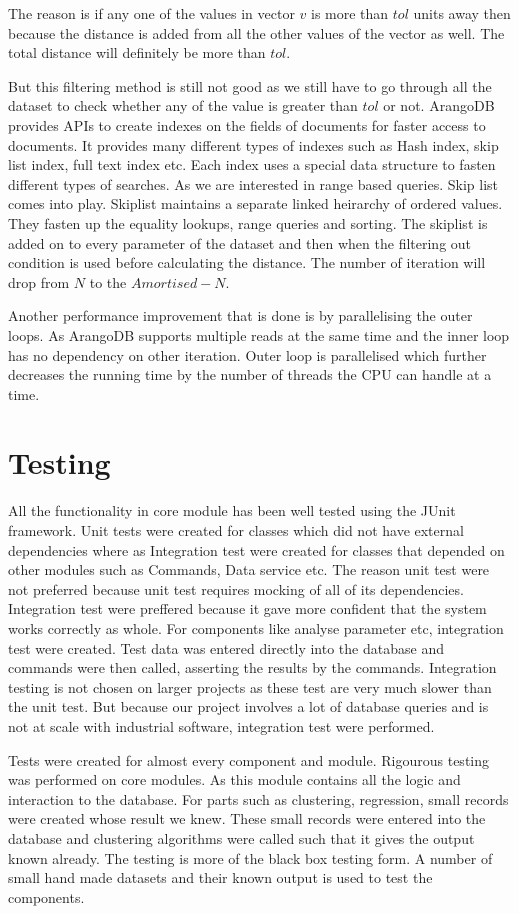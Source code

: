 The reason is if any one of the values in vector \(v\) is more than \(tol\) units away then because the distance is added from all the other values of the vector as well. The total distance will definitely be more than \(tol\).

But this filtering method is still not good as we still have to go through all the dataset to check whether any of the value is greater than \(tol\) or not. ArangoDB provides APIs to create indexes on the fields of documents for faster access to documents. It provides many different types of indexes such as Hash index, skip list index, full text index etc. Each index uses a special data structure to fasten different types of searches. As we are interested in range based queries. Skip list comes into play. Skiplist maintains a separate linked heirarchy of ordered values. They fasten up the equality lookups, range queries and sorting. The skiplist is added on to every parameter of the dataset and then when the filtering out condition is used before calculating the distance. The number of iteration will drop from \(N\) to the \(Amortised-N\).

Another performance improvement that is done is by parallelising the outer loops. As ArangoDB supports multiple reads at the same time and the inner loop has no dependency on other iteration. Outer loop is parallelised which further decreases the running time by the number of threads the CPU can handle at a time. 

\section{Testing}

All the functionality in core module has been well tested using the JUnit framework. Unit tests were created for classes which did not have external dependencies where as Integration test were created for classes that depended on other modules such as Commands, Data service etc. The reason unit test were not preferred because unit test requires mocking of all of its dependencies. Integration test were preffered because it gave more confident that the system works correctly as whole. For components like analyse parameter etc, integration test were created. Test data was entered directly into the database and commands were then called, asserting the results by the commands. Integration testing is not chosen on larger projects as these test are very much slower than the unit test. But because our project involves a lot of database queries and is not at scale with industrial software, integration test were performed. 

Tests were created for almost every component and module. Rigourous testing was performed on core modules. As this module contains all the logic and interaction to the database. For parts such as clustering, regression, small records were created whose result we knew. These small records were entered into the database and clustering algorithms were called such that it gives the output known already. The testing is more of the black box testing form. A number of small hand made datasets and their known output is used to test the components.